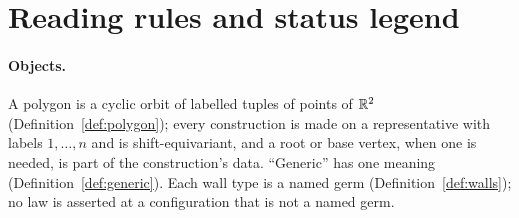 \section*{Reading rules and status legend}

\paragraph{Objects.} A polygon is a cyclic orbit of labelled tuples of points
of $\mathbb R^2$ (Definition~\ref{def:polygon}); every construction is made on a
representative with labels $1,\ldots,n$ and is shift-equivariant, and a root
or base vertex, when one is needed, is part of the construction's data.
``Generic'' has one meaning (Definition~\ref{def:generic}). Each wall type is a named germ
(Definition~\ref{def:walls}); no law is asserted at a configuration that is not
a named germ.

\ifprintstatus
